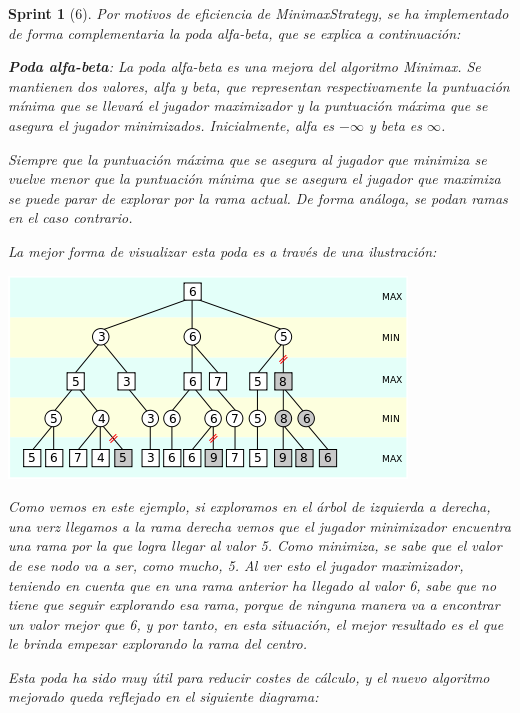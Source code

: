 \documentclass{article}
\theoremstyle{break}
\newtheorem*{sprint}{Sprint}
\begin{document}
\begin{sprint}[6]
Por motivos de eficiencia de MinimaxStrategy, se ha implementado de forma complementaria la poda alfa-beta, que se explica a continuación:

\textbf{Poda alfa-beta}:
La poda alfa-beta es una mejora del algoritmo Minimax. Se mantienen dos valores, alfa y beta, que representan respectivamente la puntuación mínima que se llevará el jugador maximizador y la puntuación máxima que se asegura el jugador minimizados. Inicialmente, alfa es $-\infty$ y beta es $\infty$. 

Siempre que la puntuación máxima que se asegura al jugador que minimiza se vuelve menor que la puntuación mínima que se asegura el jugador que maximiza se puede parar de explorar por la rama actual. De forma análoga, se podan ramas en el caso contrario.

La mejor forma de visualizar esta poda es a través de una ilustración:

\begin{center}
\centering
\includegraphics[scale=0.5]{poda alfa-beta.png}
\end{center}

Como vemos en este ejemplo, si exploramos en el árbol de izquierda a derecha, una verz llegamos a la rama derecha vemos que el jugador minimizador encuentra una rama por la que logra llegar al valor 5. Como minimiza, se sabe que el valor de ese nodo va a ser, como mucho, 5. Al ver esto el jugador maximizador, teniendo en cuenta que en una rama anterior ha llegado al valor 6, sabe que no tiene que seguir explorando esa rama, porque de ninguna manera va a encontrar un valor mejor que 6, y por tanto, en esta situación, el mejor resultado es el que le brinda empezar explorando la rama del centro.

Esta poda ha sido muy útil para reducir costes de cálculo, y el nuevo algoritmo mejorado queda reflejado en el siguiente diagrama:


\end{sprint}
\end{document}
